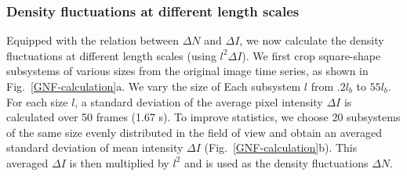 \documentclass[twocolumn,aps,prx,amsmath,amssymb,longbibliography]{revtex4-2}
\begin{document}
\subsubsection{Density fluctuations at different length scales}

Equipped with the relation between $\Delta N$ and $\Delta I$, we now calculate the density fluctuations at different length scales (using $l^2\Delta I$). We first crop square-shape subsystems of various sizes from the original image time series, as shown in Fig.~\ref{GNF-calculation}a. We vary the size of Each subsystem $l$ from $.2l_b$ to $55l_b$. For each size $l$, a standard deviation of the average pixel intensity $\Delta I$ is calculated over 50 frames (1.67 s). To improve statistics, we choose 20 subsystems of the same size evenly distributed in the field of view and obtain an averaged standard deviation of mean intensity $\Delta I$ (Fig.~\ref{GNF-calculation}b). This averaged $\Delta I$ is then multiplied by $l^2$ and is used as the density fluctuations $\Delta N$.

\end{document}
